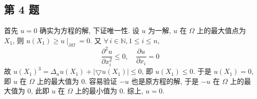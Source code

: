 \documentclass[\ROOT/main.tex]{subfiles}
\begin{document}
\subsection{第 4 题}
首先 $u = 0$ 确实为方程的解, 下证唯一性.
设 $u$ 为一解, $u$ 在 $\Omega$ 上的最大值点为 $X_1$, 则 $u \left( X_1 \right) \geqslant u \mid_{\partial \Omega} = 0$.
又 $\forall \, i \in \mathbb{N}, 1 \leqslant i \leqslant n$,
\[
    \frac{\partial^2 u}{\partial x_i^2} \leqslant 0
    , \quad
    \frac{\partial u}{\partial x_i} = 0
\]
故 $u \left( X_1 \right)^3 = \Delta_n u \left( X_1 \right) + \left| \bigtriangledown u \left( X_1 \right) \right| \leqslant 0$,
即 $u \left( X_1 \right) \leqslant 0$.
于是 $u \left( X_1 \right) = 0$, 即 $u$ 在 $\Omega$ 上的最大值为 $0$.
容易验证 $- u$ 也是原方程的解, 于是 $- u$ 在 $\Omega$ 上的最大值为 $0$,
此即 $u$ 在 $\Omega$ 上的最小值为 $0$.
综上, $u = 0$.
\end{document}
